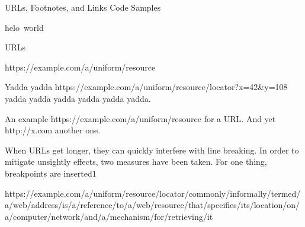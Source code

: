 
{\mktsHTwo{}URLs, Footnotes, and Links\mktsHTwoBeg}%
{\mktsHThree{}Code Samples\mktsHThreeBeg}%

\vspace{\parskip}%
\begin{multicols}{2}\raggedcolumns{}\null\par{\mktsTightParagraphs{}

{\mktsStyleCode{}helo world\par
}

}
\end{multicols}

{\mktsHThree{}URLs\mktsHThreeBeg}%

\vspace{\parskip}%
\begin{multicols}{2}

{\mktsStyleUrl{}https:\g/\g/\allowbreak{}example.com\g/\allowbreak{}a\g/\allowbreak{}uniform\g/\allowbreak{}resource\allowbreak{}}

Yadda yadda {\mktsStyleUrl{}https:\g/\g/\allowbreak{}example.com\g/\allowbreak{}a\g/\allowbreak{}uniform\g/\allowbreak{}resource\g/\allowbreak{}locator?\allowbreak{}x=42\&y=108\allowbreak{}} yadda yadda yadda yadda yadda yadda.

An example {\mktsStyleUrl{}https:\g/\g/\allowbreak{}example.com\g/\allowbreak{}a\g/\allowbreak{}uniform\g/\allowbreak{}resource\allowbreak{}} for a URL.
And yet {\mktsStyleUrl{}http:\g/\g/\allowbreak{}x.com\allowbreak{}} another one.

When URLs get longer, they can quickly interfere with line breaking. In order
to mitigate unsightly effects, two measures have been taken. For one thing,
breakpoints are inserted{\mktsEnStyleMarkMain{}1}

{\mktsStyleUrl{}https:\g/\g/\allowbreak{}example.com\g/\allowbreak{}a\g/\allowbreak{}uniform\g/\allowbreak{}resource\g/\allowbreak{}locator\g/\allowbreak{}commonly\g/\allowbreak{}informally\g/\allowbreak{}termed\g/\allowbreak{}a\g/\allowbreak{}web\g/\allowbreak{}address\g/\allowbreak{}is\g/\allowbreak{}a\g/\allowbreak{}reference\g/\allowbreak{}to\g/\allowbreak{}a\g/\allowbreak{}web\g/\allowbreak{}resource\g/\allowbreak{}that\g/\allowbreak{}specifies\g/\allowbreak{}its\g/\allowbreak{}location\g/\allowbreak{}on\g/\allowbreak{}a\g/\allowbreak{}computer\g/\allowbreak{}network\g/\allowbreak{}and\g/\allowbreak{}a\g/\allowbreak{}mechanism\g/\allowbreak{}for\g/\allowbreak{}retrieving\g/\allowbreak{}it\allowbreak{}}


\end{multicols}

